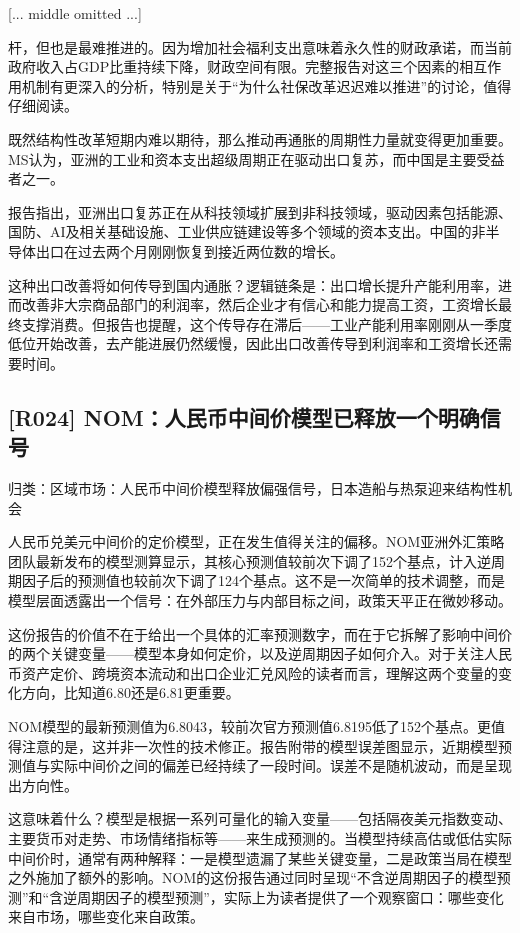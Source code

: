 \documentclass[11pt]{ctexart}
\begin{document}
[... middle omitted ...]

杆，但也是最难推进的。因为增加社会福利支出意味着永久性的财政承诺，而当前政府收入占GDP比重持续下降，财政空间有限。完整报告对这三个因素的相互作用机制有更深入的分析，特别是关于“为什么社保改革迟迟难以推进”的讨论，值得仔细阅读。

既然结构性改革短期内难以期待，那么推动再通胀的周期性力量就变得更加重要。MS认为，亚洲的工业和资本支出超级周期正在驱动出口复苏，而中国是主要受益者之一。

报告指出，亚洲出口复苏正在从科技领域扩展到非科技领域，驱动因素包括能源、国防、AI及相关基础设施、工业供应链建设等多个领域的资本支出。中国的非半导体出口在过去两个月刚刚恢复到接近两位数的增长。

这种出口改善将如何传导到国内通胀？逻辑链条是：出口增长提升产能利用率，进而改善非大宗商品部门的利润率，然后企业才有信心和能力提高工资，工资增长最终支撑消费。但报告也提醒，这个传导存在滞后——工业产能利用率刚刚从一季度低位开始改善，去产能进展仍然缓慢，因此出口改善传导到利润率和工资增长还需要时间。

\subsection{[R024] NOM：人民币中间价模型已释放一个明确信号}
{\small\color{refgray}归类：区域市场：人民币中间价模型释放偏强信号，日本造船与热泵迎来结构性机会}

人民币兑美元中间价的定价模型，正在发生值得关注的偏移。NOM亚洲外汇策略团队最新发布的模型测算显示，其核心预测值较前次下调了152个基点，计入逆周期因子后的预测值也较前次下调了124个基点。这不是一次简单的技术调整，而是模型层面透露出一个信号：在外部压力与内部目标之间，政策天平正在微妙移动。

这份报告的价值不在于给出一个具体的汇率预测数字，而在于它拆解了影响中间价的两个关键变量——模型本身如何定价，以及逆周期因子如何介入。对于关注人民币资产定价、跨境资本流动和出口企业汇兑风险的读者而言，理解这两个变量的变化方向，比知道6.80还是6.81更重要。

NOM模型的最新预测值为6.8043，较前次官方预测值6.8195低了152个基点。更值得注意的是，这并非一次性的技术修正。报告附带的模型误差图显示，近期模型预测值与实际中间价之间的偏差已经持续了一段时间。误差不是随机波动，而是呈现出方向性。

这意味着什么？模型是根据一系列可量化的输入变量——包括隔夜美元指数变动、主要货币对走势、市场情绪指标等——来生成预测的。当模型持续高估或低估实际中间价时，通常有两种解释：一是模型遗漏了某些关键变量，二是政策当局在模型之外施加了额外的影响。NOM的这份报告通过同时呈现“不含逆周期因子的模型预测”和“含逆周期因子的模型预测”，实际上为读者提供了一个观察窗口：哪些变化来自市场，哪些变化来自政策。
\end{document}
